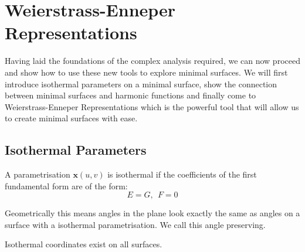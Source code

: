 \section{Weierstrass-Enneper Representations}

Having laid the foundations of the complex analysis required, we can now proceed and show how to use these new tools to explore minimal surfaces. We will first introduce isothermal parameters on a minimal surface, show the connection between minimal surfaces and harmonic functions and finally come to Weierstrass-Enneper Representations which is the powerful tool that will allow us to create minimal surfaces with ease.

\subsection{Isothermal Parameters}
\begin{definition}
A parametrisation $\mathbf x(u,v)$ is isothermal if the coefficients of the first fundamental form are of the form:
\begin{displaymath}
E = G, \ \ F = 0
\label{defisothermal}
\end{displaymath}

Geometrically this means angles in the plane look exactly the same as angles on a surface with a isothermal parametrisation. We call this angle preserving.
\end{definition}

\begin{theorem}
Isothermal coordinates exist on all surfaces.
\label{isothermal}
\end{theorem}


